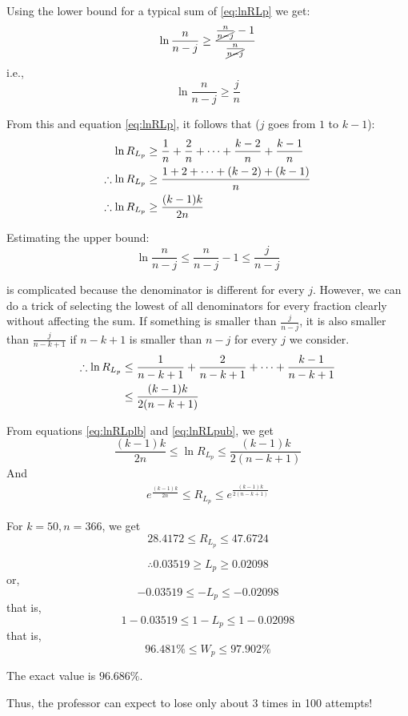 \documentclass[11pt]{book}
\theoremstyle{definition}
\theoremstyle{plain}
\theoremstyle{definition}
\theoremstyle{problemstyle}
\theoremstyle{remark}
\theoremstyle{definition}
\begin{document}
Using the lower bound for a typical sum of \ref{eq:lnRLp} we get:
\[
    \ln\frac{n}{n-j}\geq\frac{\frac{n}{\cancel{n-j}}-1}{\frac{n}{\cancel{n-j}}}
\]
i.e.,
\[
    \ln\frac{n}{n-j}\geq\frac{j}{n}
\]

From this and equation \ref{eq:lnRLp}, it follows that ($j$ goes from $1$ to $k-1$):
\begin{align}
    \ln{R_{L_p}}&\geq\frac{1}{n}+\frac{2}{n}+\dots+\frac{k-2}{n}+\frac{k-1}{n}\notag\\
    \therefore\ln{R_{L_p}}&\geq\frac{1+2+\dots+(k-2)+(k-1)}{n}\notag\\
    \therefore\ln{R_{L_p}}&\geq\frac{(k-1)k}{2n}\label{eq:lnRLplb}
\end{align}

Estimating the upper bound:
\[
    \ln{\frac{n}{n-j}}\leq\frac{n}{n-j}-1\leq\frac{j}{n-j}
\]

is complicated because the denominator is different for every $j$. However, we can do a trick of selecting the lowest of all denominators for every fraction clearly without affecting the sum. If something is smaller than $\frac{j}{n-j}$, it is also smaller than $\frac{j}{n-k+1}$ if $n-k+1$ is smaller than $n-j$ for every $j$ we consider.
\begin{align}
    \therefore\ln{R_{L_p}}&\leq\frac{1}{n-k+1}+\frac{2}{n-k+1}+\dots+\frac{k-1}{n-k+1}\notag\\
                          &\leq\frac{(k-1)k}{2(n-k+1)}
    \label{eq:lnRLpub}
\end{align}

From equations \ref{eq:lnRLplb} and \ref{eq:lnRLpub}, we get
\[
    \frac{(k-1)k}{2n}\leq\ln{R_{L_p}}\leq\frac{(k-1)k}{2(n-k+1)}
\]
And
\begin{align}
    \label{eq:lnRLpbounds}
    e^{\frac{(k-1)k}{2n}}\leq{R_{L_p}}\leq{e^{\frac{(k-1)k}{2(n-k+1)}}}
\end{align}

For $k=50,n=366$, we get
\[
    28.4172\leq{R_{L_p}}\leq{47.6724}
\]

\[
    \therefore0.03519\geq{L_p}\geq0.02098
\]
or,
\[
    -0.03519\leq{-L_p}\leq-0.02098
\]
that is,
\[
    1-0.03519\leq{1-L_p}\leq1-0.02098
\]
that is,
\[
    96.481\%\leq{W_p}\leq97.902\%
\]

The exact value is $96.686\%$.

Thus, the professor can expect to lose only about 3 times in 100 attempts!
\end{document}
